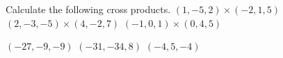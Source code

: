 
\begin{Exercise}[
name={},
title={}, 
difficulty=0,
origin={\cite{SM}}]
Calculate the following cross products.
\Question $(1,-5,2)\times(-2,1,5)$
\Question $(2,-3,-5)\times(4,-2,7)$
\Question $(-1,0,1)\times(0,4,5)$
\end{Exercise}

\begin{Answer}
\Question $(-27,-9,-9)$
\Question $(-31,-34,8)$
\Question $(-4,5,-4)$
\end{Answer}
